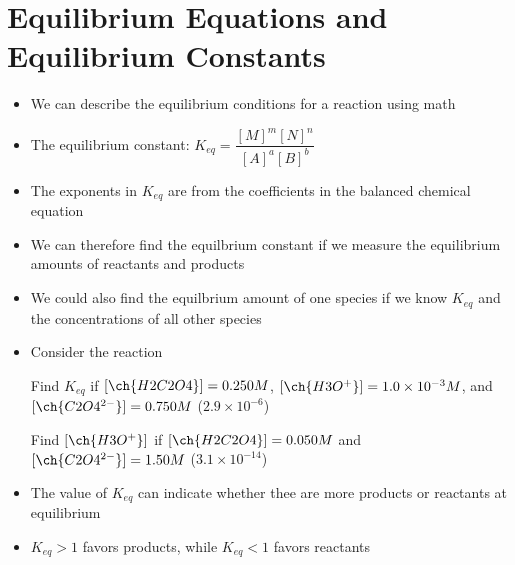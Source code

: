 \documentclass[12pt, openany, letterpaper]{memoir}
\begin{document}
\section{Equilibrium Equations and Equilibrium Constants}
\begin{itemize}
	\item We can describe the equilibrium conditions for a reaction using math
	\item The equilibrium constant: $K_{eq}=\dfrac{[M]^m[N]^n}{[A]^a[B]^b}$
	\item The exponents in $K_{eq}$ are from the coefficients in the balanced chemical equation
	\item We can therefore find the equilbrium constant if we measure the equilibrium amounts of reactants and products
	\item We could also find the equilbrium amount of one species if we know $K_{eq}$ and the concentrations of all other species
	\item Consider the reaction 

	      Find $K_{eq}$ if $[\ch{H2C2O4}]=0.250M$, $[\ch{H3O^+}]=1.0\times10^{-3}M$, and $[\ch{C2O4^{2-}}]=0.750M$ \hspace{1em} ($2.9\times10^{-6}$)

	      Find $[\ch{H3O^+}]$ if $[\ch{H2C2O4}]=0.050M$ and $[\ch{C2O4^{2-}}]=1.50M$ \hspace{1em} ($3.1\times10^{-14}$)
	\item The value of $K_{eq}$ can indicate whether thee are more products or reactants at equilibrium
	\item $K_{eq}>1$ favors products, while $K_{eq}<1$ favors reactants
\end{itemize}
\end{document}
